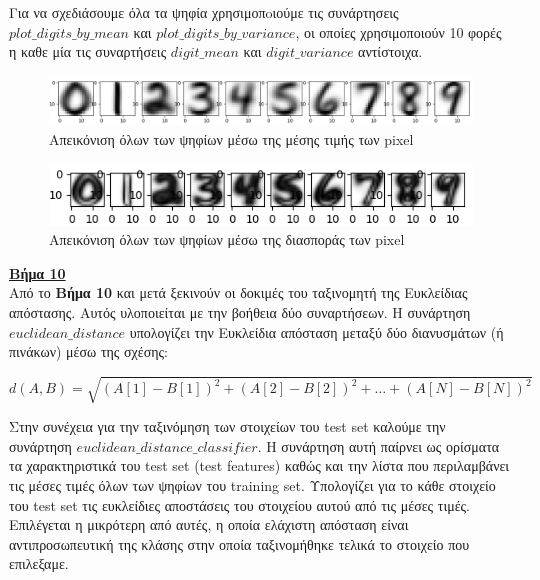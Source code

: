 \documentclass[11pt]{article} %
\begin{document}
Για να σχεδιάσουμε όλα τα ψηφία χρησιμοπoιούμε τις συνάρτησεις  $plot\_digits\_by\_mean$ και $plot\_digits\_by\_variance$, οι οποίες χρησιμοποιούν 10 φορές η καθε μία τις συναρτήσεις $digit\_mean$ και $digit\_variance$ αντίστοιχα. 

\begin{figure}[H]
    \centering
    \includegraphics[width=1.1\textwidth]{plots/all_digits_mean}
    \caption{Απεικόνιση όλων των ψηφίων μέσω της μέσης τιμής των pixel}
    \label{fig:all_mean}
\end{figure}

\begin{figure}[H]
    \centering
    \includegraphics[width=1.1\textwidth]{plots/all_digits_variance}
    \caption{Απεικόνιση όλων των ψηφίων μέσω της διασποράς των pixel}
    \label{fig:all_var}
\end{figure}


\underline{\textbf{Βήμα 10}}\\

Από το \textbf{Βήμα 10} και μετά ξεκινούν οι δοκιμές του ταξινομητή της Ευκλείδιας απόστασης. Αυτός υλοποιείται με την βοήθεια δύο συναρτήσεων. Η συνάρτηση $euclidean\_distance$ υπολογίζει την Ευκλείδια απόσταση μεταξύ δύο διανυσμάτων (ή πινάκων) μέσω της σχέσης:

\begin{equation}
\displaystyle d(A, B) = \sqrt{(A[1] -B[1]) ^ 2 + (A[2] - B[2]) ^ 2 + \dots + (A[N] - B[N]) ^ 2}
\end{equation}

Στην συνέχεια για την ταξινόμηση των στοιχείων του test set καλούμε την συνάρτηση $euclidean\_distance\_classifier$. Η συνάρτηση αυτή παίρνει ως ορίσματα τα χαρακτηριστικά του test set (test features) καθώς και την λίστα που περιλαμβάνει τις μέσες τιμές όλων των ψηφίων του training set. Υπολογίζει για το κάθε στοιχείο του test set τις ευκλείδιες αποστάσεις του στοιχείου αυτού από τις μέσες τιμές. Επιλέγεται η μικρότερη από αυτές, η οποία ελάχιστη απόσταση είναι αντιπροσωπευτική της κλάσης στην οποία ταξινομήθηκε τελικά το στοιχείο που επιλεξαμε.\\
\end{document}
